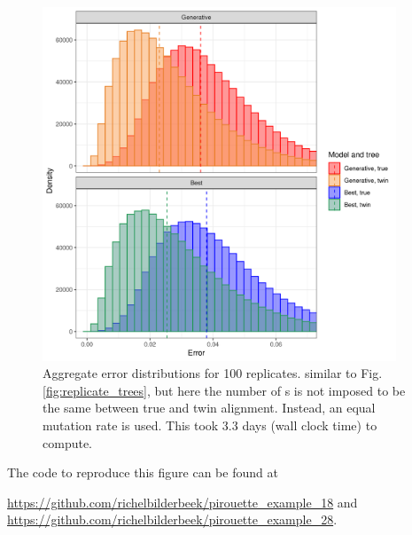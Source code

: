 \begin{figure}[H]
  \includegraphics[width=0.94\textwidth]{pirouette_example_18/errors.png}
  \caption{Aggregate error distributions for 100 replicates.
    similar to Fig. \ref{fig:replicate_trees}, 
    but here the number of s is not imposed 
    to be the same between true and twin alignment. 
    Instead, an equal mutation rate is used. 
    This took 3.3 days (wall clock time) to compute.}
  \label{fig:example_random_mutations}
\end{figure}


The code to reproduce this figure can be found at
\begin{sloppypar}
  \url{https://github.com/richelbilderbeek/pirouette_example_18} and
  \url{https://github.com/richelbilderbeek/pirouette_example_28}.
\end{sloppypar}

\newpage

